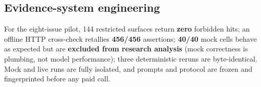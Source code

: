 \subsection{Evidence-system engineering}
For the eight-issue pilot, 144 restricted surfaces return \textbf{zero}
forbidden hits; an offline HTTP cross-check retallies \textbf{456/456}
assertions; \textbf{40/40} mock cells behave as expected but are
\textbf{excluded from research analysis} (mock correctness is plumbing, not
model performance); three deterministic reruns are byte-identical. Mock and
live runs are fully isolated, and prompts and protocol are frozen and
fingerprinted before any paid call.
